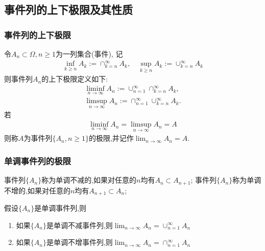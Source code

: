 \documentclass[Prob-All.tex]{subfiles}
\begin{document}
\subsection{事件列的上下极限及其性质}

\begin{frame}
	\frametitle{事件列的上下极限}
	\begin{defi}
		令$A_n\subset \Omega, n\geq 1$为一列集合(事件), 记
		\begin{eqnarray*}
			\inf_{k\geq n} A_k:=\cap_{k=n}^\infty A_k,\quad  \sup_{k\geq n}A_k:=\cup_{k=n}^\infty A_k
		\end{eqnarray*}
		则事件列$A_n$的上下极限定义如下:
		\begin{eqnarray*}
			\liminf_{n\rightarrow\infty}A_n:=\cup_{n=1}^\infty\cap_{k=n}^\infty A_k,\\%
			\limsup_{n\rightarrow\infty}A_n:=\cap_{n=1}^\infty\cup_{k=n}^\infty A_k.
		\end{eqnarray*}
		若
		\begin{eqnarray*}
			\liminf_{n\rightarrow\infty}A_n=\limsup_{n\rightarrow\infty}A_n=A
		\end{eqnarray*}
		则称$A$为事件列$\{A_n,n\geq 1\}$的极限,并记作$\lim_{n\rightarrow\infty}A_n=A$.
	\end{defi}

\end{frame}


\begin{frame}
	\frametitle{单调事件列的极限}
	\begin{defi}
		事件列$\{A_n\}$称为单调不减的,如果对任意的$n$均有$A_n\subset A_{n+1}$;     事件列$\{A_n\}$称为单调不增的,如果对任意的$n$均有$A_{n+1}\subset A_n$;
	\end{defi}
	\vspace{0.4cm}

	\pause


	\begin{thm}
		假设$\{A_n\}$是单调事件列,则
		\begin{enumerate}
			\item 如果$\{A_n\}$是单调不减事件列,则$\lim_{n\rightarrow\infty}A_n=\cup_{n=1}^\infty A_n$
			\item 如果$\{A_n\}$是单调不增事件列,则$\lim_{n\rightarrow\infty}A_n=\cap_{n=1}^\infty A_n$
		\end{enumerate}

	\end{thm}

\end{frame}
\end{document}
